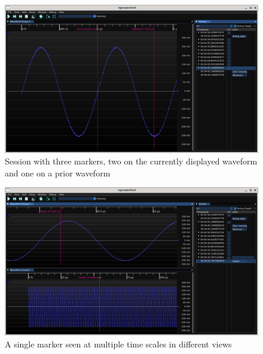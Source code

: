 \begin{figure}[H]
\centering
\includegraphics[width=13cm]{ng-images/markers.png}
\caption{Session with three markers, two on the currently displayed waveform and one on a prior waveform}
\label{markers}
\end{figure}

\begin{figure}[H]
\centering
\includegraphics[width=13cm]{ng-images/marker-multiview.png}
\caption{A single marker seen at multiple time scales in different views}
\label{marker-multiview}
\end{figure}



